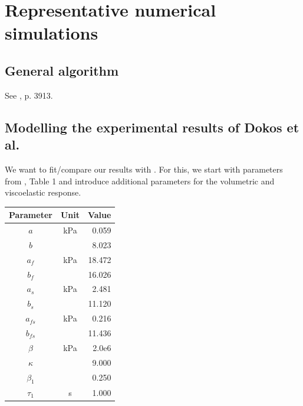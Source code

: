 \section{Representative numerical simulations}
\label{numerical-simulations}

\subsection{General algorithm}
\label{general-algorithm}

See \cite{Holzapfel:1996}, p. 3913.

\subsection{Modelling the experimental results of Dokos et al.}
\label{simulating-experiment}

We want to fit/compare our results with \cite{Dokos:2002}. For this,
we start with parameters from \cite{Holzapfel:2009bb}, Table 1 and
introduce additional parameters for the volumetric and viscoelastic
response.

\begin{tabular}{| c | c | r | }
  \hline
  Parameter & Unit & Value\\
  \hline
  $a$         & kPa  & 0.059\\
  $b$         &      & 8.023\\
  $a_{f}$     & kPa  & 18.472\\
  $b_{f}$     &      & 16.026\\
  $a_{s}$     & kPa  & 2.481\\
  $b_{s}$     &      & 11.120\\
  $a_{fs}$    & kPa  & 0.216\\
  $b_{fs}$    &      & 11.436\\
  $\beta$      & kPa   & 2.0e6 \\
  $\kappa$      &      & 9.000\\
  $\beta_{1}$  &       & 0.250\\
 $\tau_{1}$      & s     & 1.000\\
  \hline
\end{tabular}

